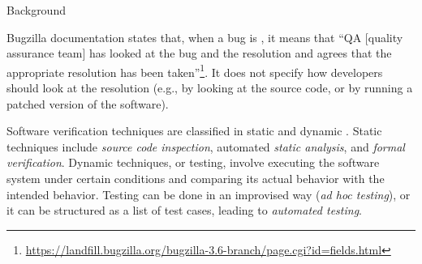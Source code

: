 \begin{section}{Background}

%
Bugzilla documentation states that, when a bug is \VERIFIED, it means that ``QA [quality assurance team] has looked at the bug and the resolution and agrees that the appropriate resolution has been taken''\footnote{\url{https://landfill.bugzilla.org/bugzilla-3.6-branch/page.cgi?id=fields.html}}. It does not specify how developers should look at the resolution (e.g., by looking at the source code, or by running a patched version of the software). 




Software verification techniques are classified in static and dynamic \cite{Sommerville1995}. Static techniques include \emph{source code inspection}, automated \emph{static analysis}, and \emph{formal verification}. Dynamic techniques, or testing, involve executing the software system under certain conditions and comparing its actual behavior with the intended behavior. Testing can be done in an improvised way (\emph{ad hoc testing}), or it can be structured as a list of test cases, leading to \emph{automated testing}.



\end{section}
